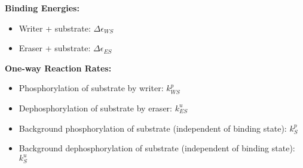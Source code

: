 \documentclass[aps,onecolumn,superscriptaddress,notitlepage]{revtex4-1}
\begin{document}
\textbf{Binding Energies:}
\begin{itemize}
\item Writer + substrate: $\Delta\epsilon_{WS}$
\item Eraser + substrate: $\Delta\epsilon_{ES}$
\end{itemize}

\textbf{One-way Reaction Rates:}
\begin{itemize}
\item Phosphorylation of substrate by writer: $k_{WS}^p$
\item Dephosphorylation of substrate by eraser: $k_{ES}^u$
\item Background phosphorylation of substrate (independent of binding state): $k_S^p$
\item Background dephosphorylation of substrate (independent of binding state): $k_S^u$
\end{itemize}
\end{document}
